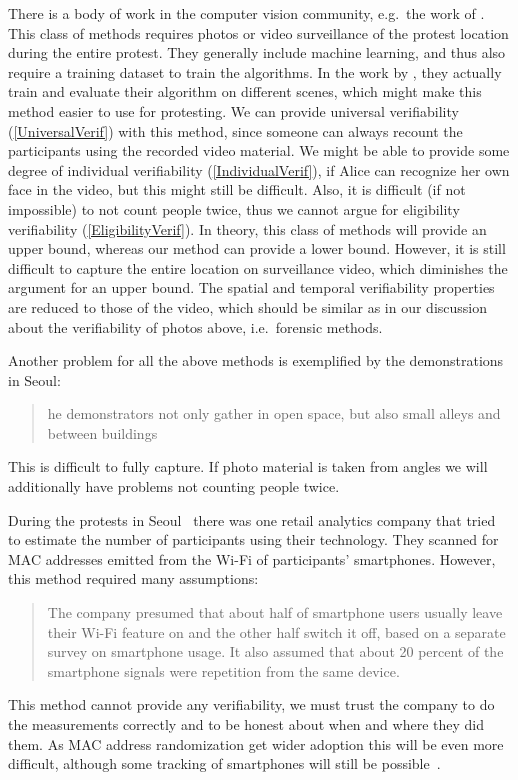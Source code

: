 There is a body of work in the computer vision community, e.g.\ the work of 
\citet{NNCrowdCounting}.
This class of methods requires photos or video surveillance of the protest 
location during the entire protest.
They generally include machine learning, and thus also require a training 
dataset to train the algorithms.
In the work by \citet{NNCrowdCounting}, they actually train and evaluate their 
algorithm on different scenes, which might make this method easier to use for 
protesting.
We can provide universal verifiability (\cref{UniversalVerif}) with this 
method, since someone can always recount the participants using the recorded 
video material.
We might be able to provide some degree of individual verifiability 
(\cref{IndividualVerif}), if Alice can recognize her own face in the video, but 
this might still be difficult.
Also, it is difficult (if not impossible) to not count people twice, thus we 
cannot argue for eligibility verifiability (\cref{EligibilityVerif}).
In theory, this class of methods will provide an upper bound, whereas our method 
can provide a lower bound.
However, it is still difficult to capture the entire location on surveillance 
video, which diminishes the argument for an upper bound.
The spatial and temporal verifiability properties are reduced to those of the 
video, which should be similar as in our discussion about the verifiability of 
photos above, i.e.\ forensic methods.

Another problem for all the above methods is exemplified by the demonstrations 
in Seoul:
\blockcquote{2016DemonstrationsInSeoul}{%
  he demonstrators not only gather in open space, but also small 
  alleys and between buildings%
}.
This is difficult to fully capture.
If photo material is taken from angles we will additionally have problems not 
counting people twice.

During the protests in Seoul~\cite{2016DemonstrationsInSeoul} there was one 
retail analytics company that tried to estimate the number of participants using 
their technology.
They scanned for MAC addresses emitted from the Wi-Fi of participants' 
smartphones.
However, this method required many assumptions:
\blockcquote{2016DemonstrationsInSeoul}{%
  The company presumed that about half of smartphone users usually leave their 
  Wi-Fi feature on and the other half switch it off, based on a separate survey 
  on smartphone usage. It also assumed that about 20 percent of the smartphone 
  signals were repetition from the same device.
}
This method cannot provide any verifiability, we must trust the company to do 
the measurements correctly and to be honest about when and where they did them.
As MAC address randomization get wider adoption this will be even more 
difficult, although some tracking of smartphones will still be 
possible~\cite{WhyMACRandomizationIsNotEnough}.

